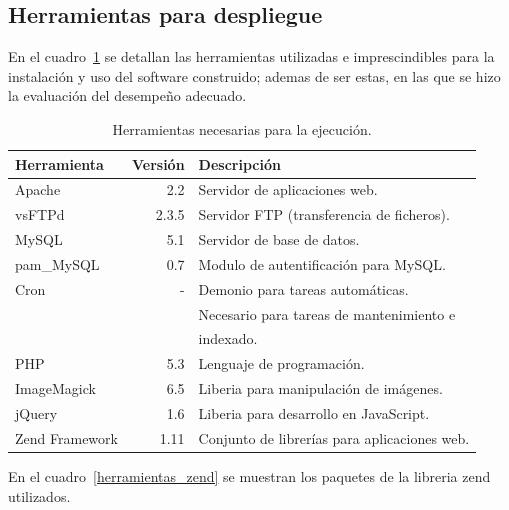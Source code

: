 \documentclass[letter,12pt]{article}
\begin{document}
\subsection{Herramientas para despliegue}
En el cuadro~\ref{herramientas_despliegue} se detallan las herramientas utilizadas e
imprescindibles para la instalación y uso del software construido; ademas de ser estas, en las
que se hizo la evaluación del desempeño adecuado.

\begin{table}
\begin{tabular}{l|r|l}
Herramienta    & Versión & Descripción                            \\
\hline
Apache         &     2.2 & Servidor de aplicaciones web.            \\
vsFTPd         &   2.3.5 & Servidor FTP (transferencia de ficheros). \\
MySQL          &     5.1 & Servidor de base de datos.                 \\
pam\_MySQL     &     0.7 & Modulo de autentificación para MySQL.       \\
Cron           &       - & Demonio para tareas automáticas.             \\
               &         & Necesario para tareas de mantenimiento e      \\
               &         & indexado.                                      \\
PHP            &     5.3 & Lenguaje de programación.                       \\
ImageMagick    &     6.5 & Liberia para manipulación de imágenes.           \\
jQuery         &     1.6 & Liberia para desarrollo en JavaScript.            \\
Zend Framework &    1.11 & Conjunto de librerías para aplicaciones web.       \\
\end{tabular}
\caption{Herramientas necesarias para la ejecución.}
\label{herramientas_despliegue}
\end{table}

En el cuadro~\ref{herramientas_zend} se muestran los paquetes de la libreria zend utilizados.
\end{document}
